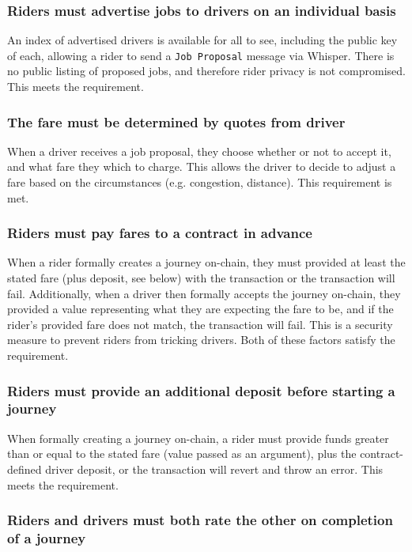 \subsubsection*{Riders must advertise jobs to drivers on an individual basis}

An index of advertised drivers is available for all to see, including the public key of each, allowing a rider to send a \lstinline{Job Proposal} message via Whisper. There is no public listing of proposed jobs, and therefore rider privacy is not compromised. This meets the requirement.

\subsubsection*{The fare must be determined by quotes from driver}

When a driver receives a job proposal, they choose whether or not to accept it, and what fare they which to charge. This allows the driver to decide to adjust a fare based on the circumstances (e.g. congestion, distance). This requirement is met.

\subsubsection*{Riders must pay fares to a contract in advance}

When a rider formally creates a journey on-chain, they must provided at least the stated fare (plus deposit, see below) with the transaction or the transaction will fail. Additionally, when a driver then formally accepts the journey on-chain, they provided a value representing what they are expecting the fare to be, and if the rider's provided fare does not match, the transaction will fail. This is a security measure to prevent riders from tricking drivers. Both of these factors satisfy the requirement.

\subsubsection*{Riders must provide an additional deposit before starting a journey}

When formally creating a journey on-chain, a rider must provide funds greater than or equal to the stated fare (value passed as an argument), plus the contract-defined driver deposit, or the transaction will revert and throw an error. This meets the requirement.

\subsubsection*{Riders and drivers must both rate the other on completion of a journey}

